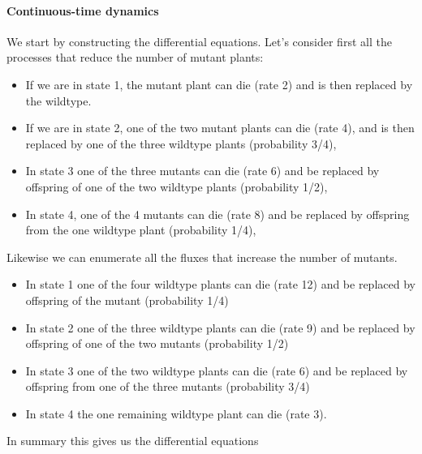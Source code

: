 \paragraph{Continuous-time dynamics}
We start by constructing the differential equations. Let's consider first all the processes that reduce the number of mutant plants:
\begin{itemize}
\item If we are in state 1, the mutant plant can die (rate 2) and is then replaced by the wildtype.
\item If we are in state 2, one of the two mutant plants can die (rate 4), and is then replaced by one of the three wildtype plants (probability 3/4),
\item In state 3 one of the three mutants can die (rate 6) and be replaced by offspring of one of the two wildtype plants (probability 1/2),
\item In state 4, one of the 4 mutants can die (rate 8) and be replaced by offspring from the one wildtype plant (probability 1/4),
\end{itemize} 
Likewise we can enumerate all the fluxes that increase the number of mutants. 
\begin{itemize}
\item In state 1 one of the four wildtype plants can die (rate 12) and be replaced by offspring of the mutant (probability 1/4)
\item In state 2 one of the three wildtype plants can die (rate 9) and be replaced by offspring of one of the two mutants (probability 1/2)
\item In state 3 one of the two wildtype plants can die (rate 6) and be replaced by offspring from one of the three mutants (probability 3/4) 
\item In state 4 the one remaining wildtype plant can die (rate 3).
\end{itemize}
In summary this gives us the differential equations 

